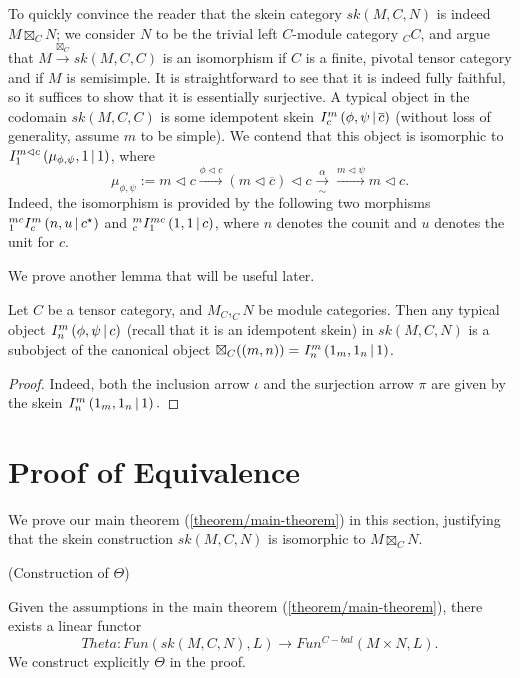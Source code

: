 \noindent To quickly convince the reader that the skein category $sk(M,C,N)$
is indeed $M \boxtimes_{C} N$; we consider $N$ to be the trivial left
$C$-module category $_{C}C$, and argue that
$M \xrightarrow{\boxtimes_{C}} sk(M,C,C)$ is an isomorphism if $C$ is a
finite, pivotal tensor category and if $M$ is semisimple. It is
straightforward to see that it is indeed fully faithful, so it suffices to
show that it is essentially surjective. A typical object in the codomain
$sk(M,C,C)$ is some idempotent skein ${}^{}_{} I^{m}_{c} \left( \phi, \psi \,\middle|\, \overline{c} \right)$
(without loss of generality, assume $m$ to be simple). We contend that this
object is isomorphic to ${}^{}_{} I^{m \lhd c}_{1} \left( \mu_{\phi, \psi}, 1 \,\middle|\, 1 \right)$, where
\[
  \mu_{\phi,\psi} := m \lhd c \xrightarrow{\phi \lhd c} (m \lhd \overline{c}) \lhd c \xrightarrow[\sim]{\alpha} \xrightarrow{m \lhd \psi} m \lhd c.
\]
Indeed, the isomorphism is provided by the following two morphisms
${}^{mc}_{1} I^{m}_{c} \left( n, u \,\middle|\, c^{\star} \right)$ and ${}^{m}_{c} I^{mc}_{1} \left( 1, 1 \,\middle|\, c \right)$, where $n$ denotes the counit and $u$ denotes the unit for $c$. %

\noindent We prove another lemma that will be useful later.

\begin{lemma}\label{lemma/I-provides-subobject}

  \noindent Let $C$ be a tensor category, and $M_{C}, _{C}N$ be module
  categories. Then any typical object ${}^{}_{} I^{m}_{n} \left( \phi, \psi \,\middle|\, c \right)$ (recall
  that it is an idempotent skein) in $sk(M,C,N)$ is a subobject of the
  canonical object $\boxtimes_{C}((m,n)) = {}^{}_{} I^{m}_{n} \left( 1_{m}, 1_{n} \,\middle|\, 1 \right)$.
\end{lemma}
\begin{proof}
  Indeed, both the inclusion arrow $\iota$ and the surjection arrow $\pi$ are
  given by the skein ${}^{}_{} I^{m}_{n} \left( 1_{m}, 1_{n} \,\middle|\, 1 \right).$
\end{proof}

\section{Proof of Equivalence}\label{section/proof-of-equivalence}

We prove our main theorem (\ref{theorem/main-theorem}) in this section, justifying that the skein construction $sk(M,C,N)$ is isomorphic to $M \boxtimes_{C} N$.

\begin{lemma}\label{lemma/construction-of-theta} (Construction of $\Theta$)

  \noindent Given the assumptions in the main theorem (\ref{theorem/main-theorem}), there exists a linear functor
  \[
    Theta: Fun(sk(M,C,N), L) \to Fun^{C-bal}(M \times N, L).
  \]
  We construct explicitly $\Theta$ in the proof.
\end{lemma}

